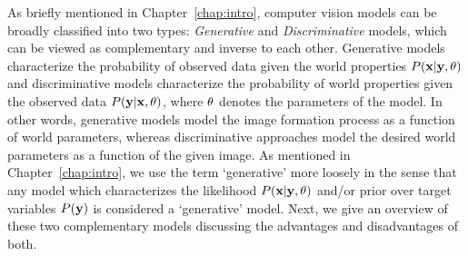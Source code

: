 As briefly mentioned in Chapter~\ref{chap:intro}, computer vision models can
be broadly classified into two types: \textit{Generative} and \textit{Discriminative}
models, which can be viewed as complementary and inverse to each other.
Generative models characterize the probability of observed data given the world
properties $P(\mathbf{x}|\mathbf{y},\mathbf{\theta})$ and discriminative models characterize
the probability of world properties given the observed data $P(\mathbf{y}|\mathbf{x},\mathbf{\theta})$,
where $\mathbf{\theta}$ denotes the parameters of the model.
In other words, generative models model the image formation process as a function
of world parameters, whereas discriminative approaches model the desired world
parameters as a function of the given image. As mentioned in Chapter~\ref{chap:intro},
we use the term `generative' more loosely in the sense that any model which characterizes
the likelihood $P(\mathbf{x}|\mathbf{y},\mathbf{\theta})$ and/or prior over target
variables $P(\mathbf{y})$ is considered a `generative' model.
Next, we give an overview of these two complementary models discussing the
advantages and disadvantages of both.

